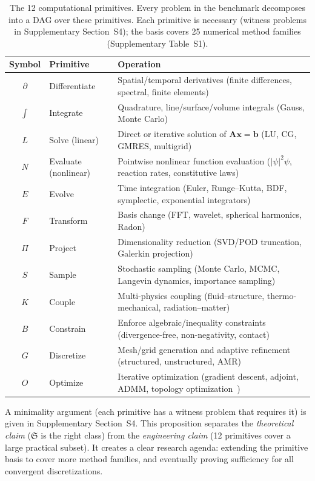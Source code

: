 \documentclass[11pt,a4paper]{article}
\newcommand{\Sclass}{\mathfrak{S}}
\begin{document}
\begin{table}[htbp]
\centering
\small
\begin{tabularx}{\textwidth}{clX}
\toprule
\textbf{Symbol} & \textbf{Primitive} & \textbf{Operation} \\
\midrule
$\partial$ & Differentiate & Spatial/temporal derivatives (finite differences, spectral, finite elements) \\
$\int$ & Integrate & Quadrature, line/surface/volume integrals (Gauss, Monte Carlo) \\
$L$ & Solve (linear) & Direct or iterative solution of $\mathbf{A}\mathbf{x} = \mathbf{b}$ (LU, CG, GMRES, multigrid) \\
$N$ & Evaluate (nonlinear) & Pointwise nonlinear function evaluation ($|\psi|^2\psi$, reaction rates, constitutive laws) \\
$E$ & Evolve & Time integration (Euler, Runge--Kutta, BDF, symplectic, exponential integrators) \\
$F$ & Transform & Basis change (FFT, wavelet, spherical harmonics, Radon) \\
$\Pi$ & Project & Dimensionality reduction (SVD/POD truncation, Galerkin projection) \\
$S$ & Sample & Stochastic sampling (Monte Carlo, MCMC, Langevin dynamics, importance sampling) \\
$K$ & Couple & Multi-physics coupling (fluid--structure, thermo-mechanical, radiation--matter) \\
$B$ & Constrain & Enforce algebraic/inequality constraints (divergence-free, non-negativity, contact) \\
$G$ & Discretize & Mesh/grid generation and adaptive refinement (structured, unstructured, AMR) \\
$O$ & Optimize & Iterative optimization (gradient descent, adjoint, ADMM, topology optimization~\cite{bendsoe1988}) \\
\bottomrule
\end{tabularx}
\caption{The 12 computational primitives. Every problem in the benchmark decomposes into a DAG over these primitives. Each primitive is necessary (witness problems in Supplementary Section~S4); the basis covers 25 numerical method families (Supplementary Table~S1).}
\label{tab:primitives}
\end{table}

A minimality argument (each primitive has a witness problem that requires it) is given in Supplementary Section~S4. This proposition separates the \emph{theoretical claim} ($\Sclass$ is the right class) from the \emph{engineering claim} (12 primitives cover a large practical subset). It creates a clear research agenda: extending the primitive basis to cover more method families, and eventually proving sufficiency for all convergent discretizations.
\end{document}
